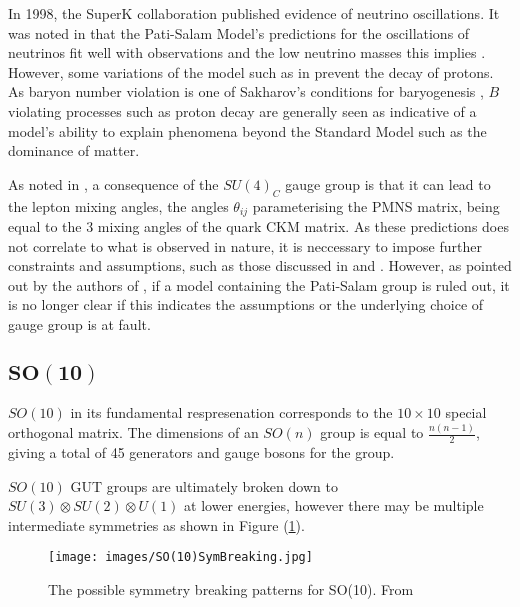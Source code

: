 \documentclass{article}
\begin{document}
In 1998, the SuperK collaboration published evidence of neutrino oscillations\cite{NeutrinoOscillations}. It was noted in \cite{SUSYSO10}  that the Pati-Salam Model's predictions for the oscillations of neutrinos fit well with observations \cite{PSVOsc} and the low neutrino masses this implies \cite{PatiSalam}. However, some variations of the model such as in \cite{PSVOscOrig} prevent the decay of protons. As baryon number violation is one of Sakharov's conditions for baryogenesis \cite{SakharovConditions}, $B$ violating processes such as proton decay are generally seen as indicative of a model's ability to explain phenomena beyond the Standard Model such as the dominance of matter.

As noted in \cite{SUSYSO10NeutrinoMixing}, a consequence of the $SU(4)_C$ gauge group is that it can lead to the lepton mixing angles, the angles $\theta_{ij}$ parameterising the PMNS matrix, being equal to the 3 mixing angles of the quark CKM matrix. As these predictions does not correlate to what is observed in nature, it is neccessary to impose further constraints and assumptions, such as those discussed in \cite{SO10Mixing1} and \cite{SO10Mixing2}. However, as pointed out by the authors of \cite{SUSYSO10NeutrinoMixing}, if a model containing the Pati-Salam group is ruled out, it is no longer clear if this indicates the assumptions or the underlying choice of gauge group is at fault.

\subsection{$\bm{SO(10)}$}%
\label{sec:GUT_SO10}
$SO(10)$ in its fundamental respresenation corresponds to the $10\times10$ special orthogonal matrix. The dimensions of an $SO(n)$ group is equal to $\frac{n(n-1)}{2}$, giving a total of 45 generators and gauge bosons for the group.

$SO(10)$ GUT groups are ultimately broken down to $SU(3)\otimes SU(2)\otimes U(1)$ at lower energies, however there may be multiple intermediate symmetries as shown in Figure (\ref{fig:SO10}).

\begin{figure}
    \centering
    \texttt{[image: images/SO(10)SymBreaking.jpg]}
    \caption{The possible symmetry breaking patterns for SO(10). From \cite{SO10SymFig}\label{fig:SO10}}
\end{figure}
\end{document}
